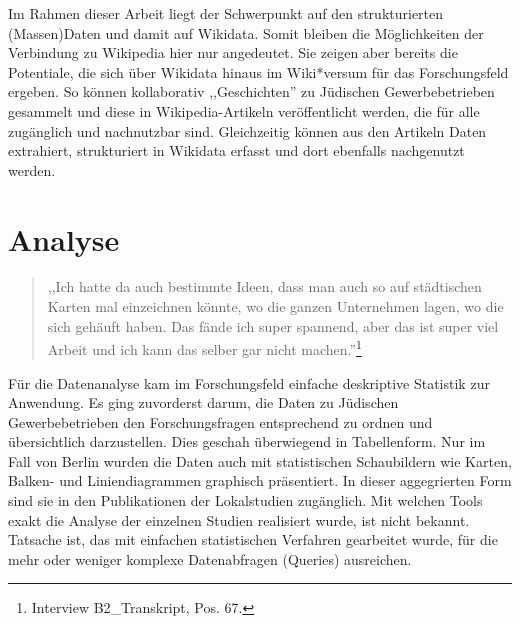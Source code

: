 Im Rahmen dieser Arbeit liegt der Schwerpunkt auf den strukturierten (Massen)Daten und damit auf Wikidata. Somit bleiben die Möglichkeiten der Verbindung zu Wikipedia hier nur angedeutet. Sie zeigen aber bereits die Potentiale, die sich über Wikidata hinaus im Wiki*versum für das Forschungsfeld ergeben. So können kollaborativ ,,Geschichten'' zu Jüdischen Gewerbebetrieben gesammelt und diese in Wikipedia-Artikeln veröffentlicht werden, die für alle zugänglich und nachnutzbar sind. Gleichzeitig können aus den Artikeln Daten extrahiert, strukturiert in Wikidata erfasst und dort ebenfalls nachgenutzt werden.

\section{Analyse}

\begin{quote}
    ,,Ich hatte da auch bestimmte Ideen, dass man auch so auf städtischen Karten mal einzeichnen könnte, wo die ganzen Unternehmen lagen, wo die sich gehäuft haben. Das fände ich super spannend, aber das ist super viel Arbeit und ich kann das selber gar nicht machen.''\footnote{Interview B2\_Transkript, Pos. 67.}
\end{quote}

Für die Datenanalyse kam im Forschungsfeld einfache deskriptive Statistik zur Anwendung. Es ging zuvorderst darum, die Daten zu Jüdischen Gewerbebetrieben den Forschungsfragen entsprechend zu ordnen und übersichtlich darzustellen. Dies geschah überwiegend in Tabellenform. Nur im Fall von Berlin wurden die Daten auch mit statistischen Schaubildern wie Karten, Balken- und Liniendiagrammen graphisch präsentiert. In dieser aggegrierten Form sind sie in den Publikationen der Lokalstudien zugänglich. Mit welchen Tools exakt die Analyse der einzelnen Studien realisiert wurde, ist nicht bekannt. Tatsache ist, das mit einfachen statistischen Verfahren gearbeitet wurde, für die mehr oder weniger komplexe Datenabfragen (Queries) ausreichen. 

